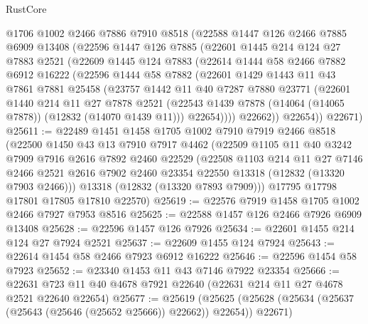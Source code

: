 \begin{lexlean}{RustCore}
\begin{coremodule}
    @1706
    @1002
    @2466
    @7886
    @7910
    @8518
    (@22588
      @1447
      @126
      @2466
      @7885
      @6909
      @13408
      (@22596
        @1447
        @126
        @7885
        (@22601
          @1445
          @214
          @124
          @27
          @7883
          @2521
          (@22609
            @1445
            @124
            @7883
            (@22614
              @1444
              @58
              @2466
              @7882
              @6912
              @16222
              (@22596
                @1444
                @58
                @7882
                (@22601
                  @1429
                  @1443
                  @11
                  @43
                  @7861
                  @7881
                  @25458
                  (@23757
                    @1442
                    @11
                    @40
                    @7287
                    @7880
                    @23771
                    (@22601
                      @1440
                      @214
                      @11
                      @27
                      @7878
                      @2521
                      (@22543 @1439 @7878 (@14064 (@14065 @7878)) (@12832 (@14070 @1439 @11)))
                      @22654))))
              @22662))
          @22654))
      @22671)
@25611 := @22489
    @1451
    @1458
    @1705
    @1002
    @7910
    @7919
    @2466
    @8518
    (@22500
      @1450
      @43
      @13
      @7910
      @7917
      @4462
      (@22509
        @1105
        @11
        @40
        @3242
        @7909
        @7916
        @2616
        @7892
        @2460
        @22529
        (@22508
          @1103
          @214
          @11
          @27
          @7146
          @2466
          @2521
          @2616
          @7902
          @2460
          @23354
          @22550
          @13318
          (@12832 (@13320 @7903 @2466)))
        @13318
        (@12832 (@13320 @7893 @7909)))
      @17795
      @17798
      @17801
      @17805
      @17810
      @22570)
@25619 := @22576 @7919 @1458 @1705 @1002 @2466 @7927 @7953 @8516
@25625 := @22588 @1457 @126 @2466 @7926 @6909 @13408
@25628 := @22596 @1457 @126 @7926
@25634 := @22601 @1455 @214 @124 @27 @7924 @2521
@25637 := @22609 @1455 @124 @7924
@25643 := @22614 @1454 @58 @2466 @7923 @6912 @16222
@25646 := @22596 @1454 @58 @7923
@25652 := @23340 @1453 @11 @43 @7146 @7922 @23354
@25666 := @22631 @723 @11 @40 @4678 @7921 @22640 (@22631 @214 @11 @27 @4678 @2521 @22640 @22654)
@25677 := @25619
    (@25625 (@25628 (@25634 (@25637 (@25643 (@25646 (@25652 @25666)) @22662)) @22654)) @22671)

\end{coremodule}
\end{lexlean}
